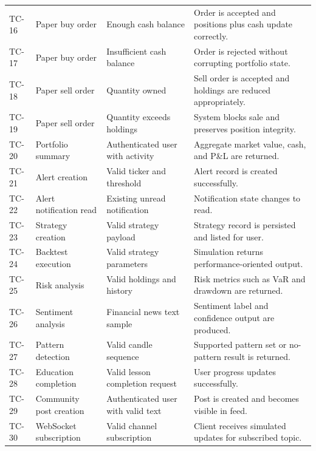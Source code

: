 \documentclass[12pt,a4paper]{report}
\begin{document}
\begin{longtable}{p{} p{} p{} p{}}
TC-16 & Paper buy order & Enough cash balance & Order is accepted and positions plus cash update correctly. \\
TC-17 & Paper buy order & Insufficient cash balance & Order is rejected without corrupting portfolio state. \\
TC-18 & Paper sell order & Quantity owned & Sell order is accepted and holdings are reduced appropriately. \\
TC-19 & Paper sell order & Quantity exceeds holdings & System blocks sale and preserves position integrity. \\
TC-20 & Portfolio summary & Authenticated user with activity & Aggregate market value, cash, and P\&L are returned. \\
TC-21 & Alert creation & Valid ticker and threshold & Alert record is created successfully. \\
TC-22 & Alert notification read & Existing unread notification & Notification state changes to read. \\
TC-23 & Strategy creation & Valid strategy payload & Strategy record is persisted and listed for user. \\
TC-24 & Backtest execution & Valid strategy parameters & Simulation returns performance-oriented output. \\
TC-25 & Risk analysis & Valid holdings and history & Risk metrics such as VaR and drawdown are returned. \\
TC-26 & Sentiment analysis & Financial news text sample & Sentiment label and confidence output are produced. \\
TC-27 & Pattern detection & Valid candle sequence & Supported pattern set or no-pattern result is returned. \\
TC-28 & Education completion & Valid lesson completion request & User progress updates successfully. \\
TC-29 & Community post creation & Authenticated user with valid text & Post is created and becomes visible in feed. \\
TC-30 & WebSocket subscription & Valid channel subscription & Client receives simulated updates for subscribed topic. \\
\end{longtable}
\end{document}
